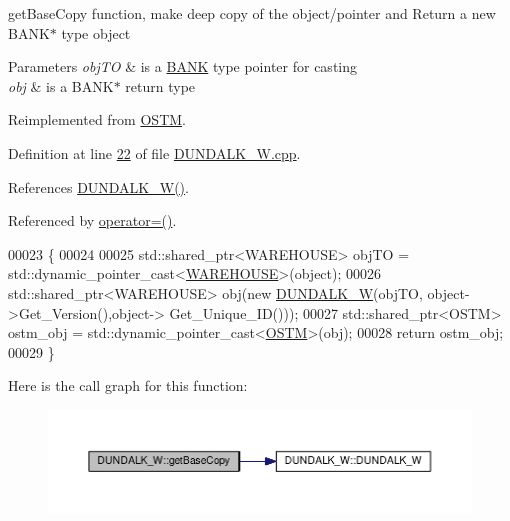 get\+Base\+Copy function, make deep copy of the object/pointer and Return a new B\+A\+N\+K$\ast$ type object 


\begin{DoxyParams}{Parameters}
{\em obj\+TO} & is a \hyperlink{class_b_a_n_k}{B\+A\+NK} type pointer for casting \\
\hline
{\em obj} & is a B\+A\+N\+K$\ast$ return type \\
\hline
\end{DoxyParams}


Reimplemented from \hyperlink{class_o_s_t_m_a0bfa3763bd441407dd6365f42714f94c_a0bfa3763bd441407dd6365f42714f94c}{O\+S\+TM}.



Definition at line \hyperlink{_d_u_n_d_a_l_k___w_8cpp_source_l00022}{22} of file \hyperlink{_d_u_n_d_a_l_k___w_8cpp_source}{D\+U\+N\+D\+A\+L\+K\+\_\+\+W.\+cpp}.



References \hyperlink{_d_u_n_d_a_l_k___w_8h_source_l00024}{D\+U\+N\+D\+A\+L\+K\+\_\+\+W()}.



Referenced by \hyperlink{_d_u_n_d_a_l_k___w_8h_source_l00075}{operator=()}.


\begin{DoxyCode}
00023 \{
00024 
00025     std::shared\_ptr<WAREHOUSE> objTO = std::dynamic\_pointer\_cast<\hyperlink{class_w_a_r_e_h_o_u_s_e}{WAREHOUSE}>(object);
00026     std::shared\_ptr<WAREHOUSE> obj(\textcolor{keyword}{new} \hyperlink{class_d_u_n_d_a_l_k___w_ad459a77b4f3e0aaebb3d178eb014a77f_ad459a77b4f3e0aaebb3d178eb014a77f}{DUNDALK\_W}(objTO, object->Get\_Version(),\textcolor{keywordtype}{object}->
      Get\_Unique\_ID()));
00027     std::shared\_ptr<OSTM> ostm\_obj = std::dynamic\_pointer\_cast<\hyperlink{class_o_s_t_m}{OSTM}>(obj);
00028     \textcolor{keywordflow}{return} ostm\_obj;
00029 \}
\end{DoxyCode}


Here is the call graph for this function\+:\nopagebreak
\begin{figure}[H]
\begin{center}
\leavevmode
\includegraphics[width=350pt]{class_d_u_n_d_a_l_k___w_a06cbcac20829906b710962967795d4e6_a06cbcac20829906b710962967795d4e6_cgraph}
\end{center}
\end{figure}


